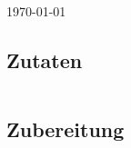 \documentclass[fontsize=15pt,paper=a4]{scrdoc}
\begin{document}
\section*{}
\vspace{-15pt}
\begin{center}
    \scriptsize \today
\end{center}
\subsection*{Zutaten}
\begin{tabularx}{\textwidth}{XX}
    
\end{tabularx}

\subsection*{Zubereitung}
\begin{enumerate}
    
\end{enumerate}
\end{document}
